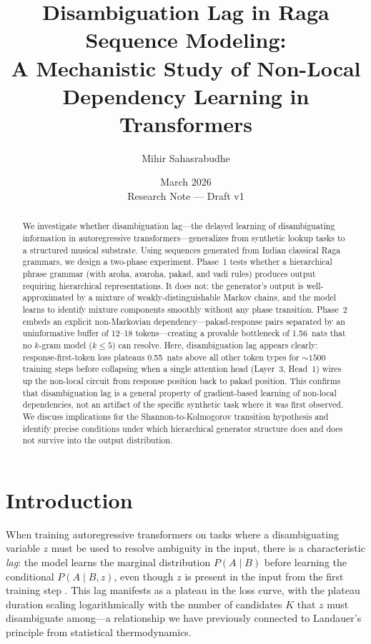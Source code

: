 \documentclass[11pt,a4paper]{article}
\title{Disambiguation Lag in Raga Sequence Modeling:\\
\large A Mechanistic Study of Non-Local Dependency Learning in Transformers}
\author{Mihir Sahasrabudhe}
\date{March 2026 \\ \small Research Note --- Draft v1}
\begin{document}
\maketitle

\begin{abstract}
We investigate whether disambiguation lag---the delayed learning of disambiguating information in autoregressive transformers---generalizes from synthetic lookup tasks to a structured musical substrate. Using sequences generated from Indian classical Raga grammars, we design a two-phase experiment. Phase~1 tests whether a hierarchical phrase grammar (with aroha, avaroha, pakad, and vadi rules) produces output requiring hierarchical representations. It does not: the generator's output is well-approximated by a mixture of weakly-distinguishable Markov chains, and the model learns to identify mixture components smoothly without any phase transition. Phase~2 embeds an explicit non-Markovian dependency---pakad-response pairs separated by an uninformative buffer of 12--18 tokens---creating a provable bottleneck of 1.56~nats that no $k$-gram model ($k \leq 5$) can resolve. Here, disambiguation lag appears clearly: response-first-token loss plateaus 0.55~nats above all other token types for ${\sim}1500$ training steps before collapsing when a single attention head (Layer~3, Head~1) wires up the non-local circuit from response position back to pakad position. This confirms that disambiguation lag is a general property of gradient-based learning of non-local dependencies, not an artifact of the specific synthetic task where it was first observed. We discuss implications for the Shannon-to-Kolmogorov transition hypothesis and identify precise conditions under which hierarchical generator structure does and does not survive into the output distribution.
\end{abstract}

\section{Introduction}

When training autoregressive transformers on tasks where a disambiguating variable $z$ must be used to resolve ambiguity in the input, there is a characteristic \emph{lag}: the model learns the marginal distribution $P(A \mid B)$ before learning the conditional $P(A \mid B, z)$, even though $z$ is present in the input from the first training step \citep{sahasrabudhe2026late}. This lag manifests as a plateau in the loss curve, with the plateau duration scaling logarithmically with the number of candidates $K$ that $z$ must disambiguate among---a relationship we have previously connected to Landauer's principle from statistical thermodynamics.
\end{document}
